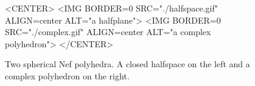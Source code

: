 \begin{figure}[htbp]
\begin{ccTexOnly}
\begin{center}
\hspace{1cm}
\end{center}
\end{ccTexOnly}
\caption{Two spherical Nef polyhedra. A closed halfspace on the left 
  and a complex polyhedron on the right.}\label{nefexamples}
\begin{ccHtmlOnly}
<CENTER>
<IMG BORDER=0 SRC="./halfspace.gif" ALIGN=center
ALT="a halfplane">
<IMG BORDER=0 SRC="./complex.gif" ALIGN=center
ALT="a complex polyhedron">
</CENTER>
\end{ccHtmlOnly}
\end{figure}      

